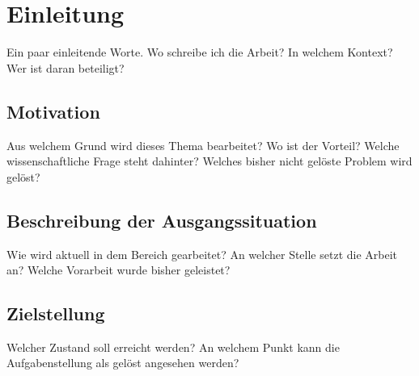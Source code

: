 


\section{Einleitung}

Ein paar einleitende Worte. Wo schreibe ich die Arbeit? In welchem Kontext? Wer ist daran beteiligt?


	\subsection{Motivation}
	
	Aus welchem Grund wird dieses Thema bearbeitet? Wo ist der Vorteil? Welche wissenschaftliche Frage steht dahinter? Welches bisher nicht gelöste Problem wird gelöst?
	

	\subsection{Beschreibung der Ausgangssituation}
	
	Wie wird aktuell in dem Bereich gearbeitet? An welcher Stelle setzt die Arbeit an? Welche Vorarbeit wurde bisher geleistet?
	
	
	\subsection{Zielstellung} \label{sec:Zielstellung}
	
	Welcher Zustand soll erreicht werden? An welchem Punkt kann die Aufgabenstellung als gelöst angesehen werden?
	
	
	
	
	
	
	
